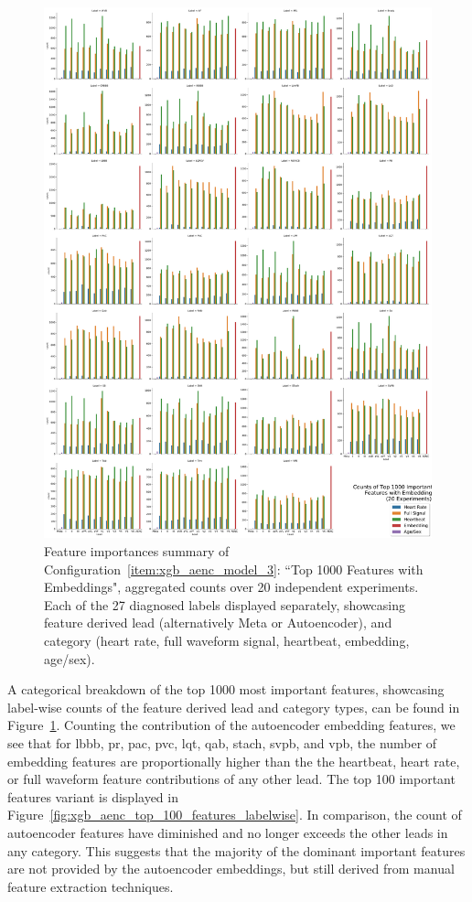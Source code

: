 \documentclass[\main/thesis.tex]{subfiles}
\begin{document}
\begin{figure}[t]
    \centering
    \includegraphics[width=\textwidth]{figure/top_1000_feature_importances_all_w_embedding.pdf}
    \caption{Feature importances summary of Configuration~\ref{item:xgb_aenc_model_3}: ``Top 1000 Features with Embeddings", aggregated counts over 20 independent experiments. Each of the 27 diagnosed labels displayed separately, showcasing feature derived lead (alternatively Meta or Autoencoder), and category (heart rate, full waveform signal, heartbeat, embedding, age/sex).}
    \label{fig:xgb_aenc_top_1000_features_labelwise}
\end{figure}

A categorical breakdown of the top 1000 most important features, showcasing label-wise counts of the feature derived lead and category types, can be found in Figure~\ref{fig:xgb_aenc_top_1000_features_labelwise}.
Counting the contribution of the autoencoder embedding features, we see that for \gls{lbbb}, \gls{pr}, \gls{pac}, \gls{pvc}, \gls{lqt}, \gls{qab}, \gls{stach}, \gls{svpb}, and \gls{vpb}, the number of embedding features are proportionally higher than the the heartbeat, heart rate, or full waveform feature contributions of any other lead.
The top 100 important features variant is displayed in Figure~\ref{fig:xgb_aenc_top_100_features_labelwise}.
In comparison, the count of autoencoder features have diminished and no longer exceeds the other leads in any category.
This suggests that the majority of the dominant important features are not provided by the autoencoder embeddings, but still derived from manual feature extraction techniques.
\end{document}
